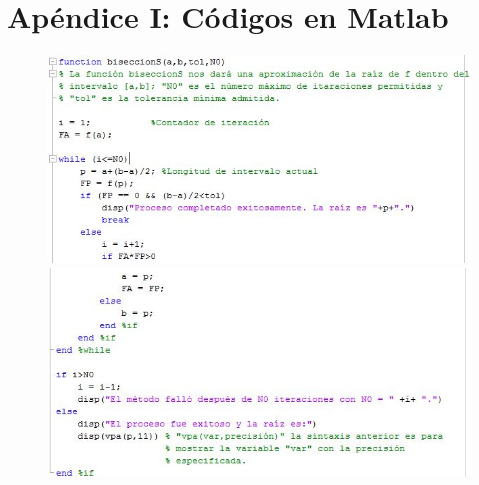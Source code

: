 \section*{Apéndice I: Códigos en Matlab}

\begin{figure}[h!]
\centering
  \includegraphics[width=1\textwidth]{BiseccionC1.JPG}
  \includegraphics[width=1\textwidth]{BiseccionC2.JPG}
\end{figure} 

